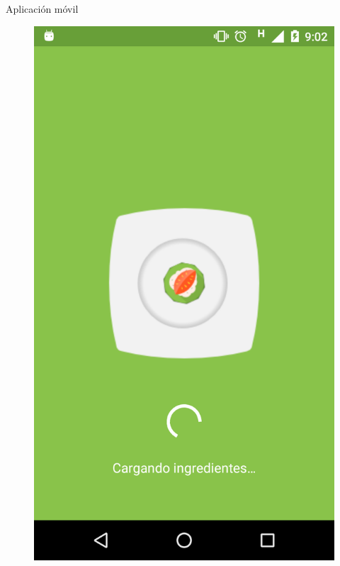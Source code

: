 \documentclass[10pt,xcolor=svgnames]{beamer}
\begin{document}
\begin{frame}{Aplicación móvil}
  \begin{minipage}{\linewidth}
    \centering
    \begin{minipage}{0.4\linewidth}
      \begin{figure}[H]
        \includegraphics[width=\linewidth]{img/captura_02}
      \end{figure}
    \end{minipage}
    \hspace{0.05\linewidth}

\end{minipage}
\end{frame}
\end{document}
